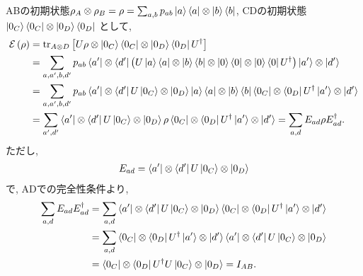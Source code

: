\begin{ex}
    \label{ex8.3}
    ABの初期状態$\rho_A \otimes \rho_B = \rho =
        \sum_{a,b} p_{ab} \ket{a}\bra{a} \otimes \ket{b}\bra{b}$,
    CDの初期状態$\ket{0_C}\bra{0_C} \otimes \ket{0_D}\bra{0_D}$
    として,
    \begin{align*}
        \mathcal{E}\left(\rho\right)
         & =
        \mathrm{tr}_{A \otimes D}
        \left[
            U \rho \otimes \ket{0_C}\bra{0_C} \otimes \ket{0_D}\bra{0_D} U^\dagger
            \right]
        \\
         & =
        \sum_{a,a', b, d'}
        p_{ab}
        \bra{a'} \otimes \bra{d'}
        \left(
        U \ket{a} \bra{a} \otimes \ket{b}\bra{b} \otimes \ket{0}\bra{0} \otimes \ket{0}\bra{0} U^\dagger
        \right)
        \ket{a'} \otimes \ket{d'}
        \\
         & =
        \sum_{a,a', b, d'}
        p_{ab}
        \bra{a'} \otimes \bra{d'}
        U
        \ket{0_C} \otimes \ket{0_D}
        \ket{a}\bra{a} \otimes \ket{b}\bra{b}
        \bra{0_C} \otimes \bra{0_D}
        U^\dagger
        \ket{a'} \otimes \ket{d'}
        \\
         & =
        \sum_{a',d'}
        \bra{a'} \otimes \bra{d'}
        U
        \ket{0_C} \otimes \ket{0_D}
        \rho
        \bra{0_C} \otimes \bra{0_D}
        U^\dagger
        \ket{a'} \otimes \ket{d'} =
        \sum_{a,d}
        E_{ad}
        \rho
        E_{ad}^\dagger.
    \end{align*}
    ただし,
    \begin{align*}
        E_{ad} = \bra{a'} \otimes \bra{d'}
        U
        \ket{0_C} \otimes \ket{0_D}
    \end{align*}
    で, ADでの完全性条件より,
    \begin{align*}
        \sum_{a,d}
        E_{ad}
        E_{ad}^\dagger
         & =
        \sum_{a,d}
        \bra{a'} \otimes \bra{d'}
        U
        \ket{0_C} \otimes \ket{0_D}
        \bra{0_C} \otimes \bra{0_D}
        U^\dagger
        \ket{a'} \otimes \ket{d'}
        \\
         & =
        \sum_{a,d}
        \bra{0_C} \otimes \bra{0_D}
        U^\dagger
        \ket{a'} \otimes \ket{d'}
        \bra{a'} \otimes \bra{d'}
        U
        \ket{0_C} \otimes \ket{0_D}
        \\
         & =
        \bra{0_C} \otimes \bra{0_D}
        U^\dagger
        U
        \ket{0_C} \otimes \ket{0_D} = I_{AB}.
    \end{align*}
\end{ex}

